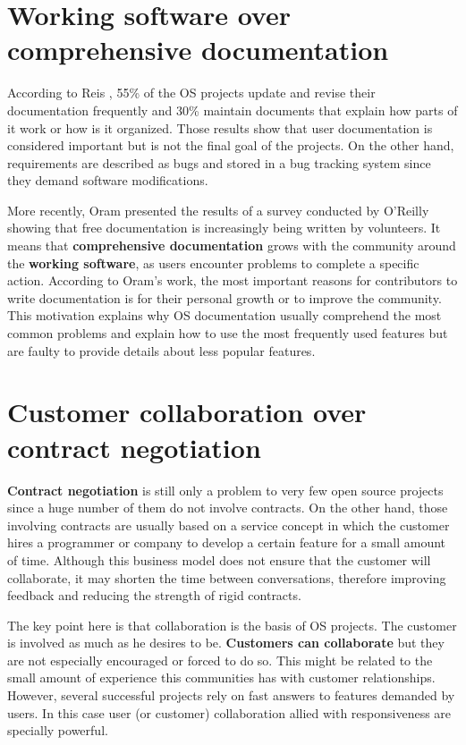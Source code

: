 
\section{Working software over comprehensive documentation}
\label{sec:second-princ}

According to Reis \cite{Reis2003}, 55\% of the OS projects update and
revise their documentation frequently and 30\% maintain documents that
explain how parts of it work or how is it organized. Those results
show that user documentation is considered important but is not the
final goal of the projects. On the other hand, requirements are
described as bugs and stored in a bug tracking system since they
demand software modifications.

More recently, Oram \cite{Oram2007} presented the results of a survey
conducted by O'Reilly showing that free documentation is increasingly
being written by volunteers. It means that \textbf{comprehensive
  documentation} grows with the community around the \textbf{working
  software}, as users encounter problems to complete a specific
action. According to Oram's work, the most important reasons for
contributors to write documentation is for their personal growth or to
improve the community. This motivation explains why OS documentation
usually comprehend the most common problems and explain how to use the
most frequently used features but are faulty to provide details about
less popular features.

\section{Customer collaboration over contract negotiation}
\label{sec:third-princ}

\textbf{Contract negotiation} is still only a problem to very few open
source projects since a huge number of them do not involve
contracts. On the other hand, those involving contracts are usually
based on a service concept in which the customer hires a programmer or
company to develop a certain feature for a small amount of
time. Although this business model does not ensure that the customer
will collaborate, it may shorten the time between conversations,
therefore improving feedback and reducing the strength of rigid
contracts.

The key point here is that collaboration is the basis of OS
projects. The customer is involved as much as he desires to
be. \textbf{Customers can collaborate} but they are not especially
encouraged or forced to do so. This might be related to the small
amount of experience this communities has with customer
relationships. However, several successful projects rely on fast
answers to features demanded by users. In this case user (or customer)
collaboration allied with responsiveness are specially powerful.

